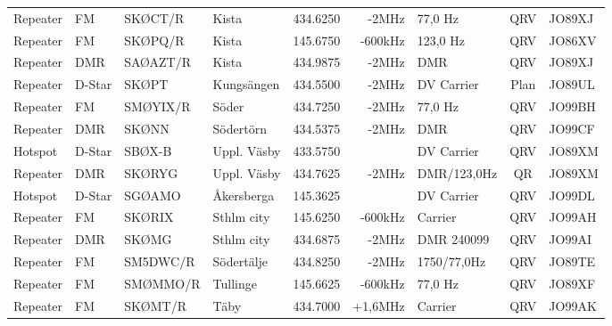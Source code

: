 \begin{landscape}
\begin{longtable}{llllrrlcl}
	Repeater          & FM           & SKØCT/R       & Kista        &          434.6250 &          -2MHz & 77,0 Hz         &       QRV       & JO89XJ           \\
	Repeater          & FM           & SKØPQ/R       & Kista        &          145.6750 &        -600kHz & 123,0 Hz        &       QRV       & JO86XV           \\
	Repeater          & DMR          & SAØAZT/R      & Kista        &          434.9875 &          -2MHz & DMR             &       QRV       & JO89XJ           \\
	Repeater          & D-Star       & SKØPT         & Kungsängen   &          434.5500 &          -2MHz & DV Carrier      &      Plan       & JO89UL           \\
	Repeater          & FM           & SMØYIX/R      & Söder        &          434.7250 &          -2MHz & 77,0 Hz         &       QRV       & JO99BH           \\
	Repeater          & DMR          & SKØNN         & Södertörn    &          434.5375 &          -2MHz & DMR             &       QRV       & JO99CF           \\
	Hotspot           & D-Star       & SBØX-B        & Uppl. Väsby  &          433.5750 &                & DV Carrier      &       QRV       & JO89XM           \\
	Repeater          & DMR          & SKØRYG        & Uppl. Väsby  &          434.7625 &          -2MHz & DMR/123,0Hz    &       QR        & JO89XM           \\
	Hotspot           & D-Star       & SGØAMO        & Åkersberga   &          145.3625 &                & DV Carrier      &       QRV       & JO99DL           \\
	Repeater          & FM           & SKØRIX        & Sthlm city   &          145.6250 &        -600kHz & Carrier         &       QRV       & JO99AH           \\
	Repeater          & DMR          & SKØMG         & Sthlm city   &          434.6875 &          -2MHz & DMR 240099      &       QRV       & JO99AI           \\
	Repeater          & FM           & SM5DWC/R      & Södertälje   &          434.8250 &          -2MHz & 1750/77,0Hz    &       QRV       & JO89TE           \\
	Repeater          & FM           & SMØMMO/R      & Tullinge     &          145.6625 &        -600kHz & 77,0 Hz         &       QRV       & JO89XF           \\
	Repeater          & FM           & SKØMT/R       & Täby         &          434.7000 &        +1,6MHz & Carrier         &       QRV       & JO99AK           \\

\end{longtable}
\end{landscape}
